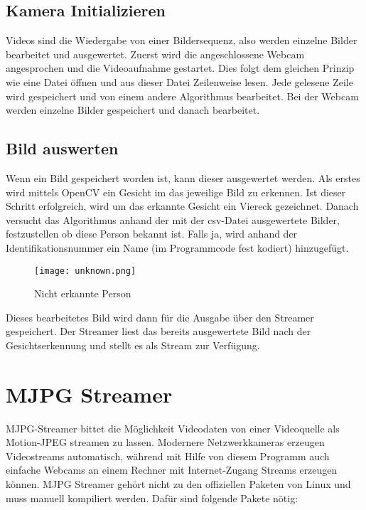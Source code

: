 \subsection{Kamera Initializieren}
 Videos sind die Wiedergabe von einer Bildersequenz, also werden einzelne Bilder bearbeitet und ausgewertet.  Zuerst wird die angeschlossene Webcam angesprochen und die Videoaufnahme gestartet. Dies folgt dem gleichen Prinzip wie eine Datei öffnen und aus dieser Datei Zeilenweise lesen. Jede gelesene Zeile wird gespeichert und von einem andere Algorithmus bearbeitet. Bei der Webcam werden einzelne Bilder gespeichert und danach bearbeitet.\\
 
\subsection{Bild auswerten}
 Wenn ein Bild gespeichert worden ist, kann dieser ausgewertet werden. Als erstes wird mittels OpenCV ein Gesicht im das jeweilige Bild zu erkennen. Ist dieser Schritt erfolgreich, wird um das erkannte Gesicht ein Viereck gezeichnet. Danach versucht das Algorithmus anhand der mit der csv-Datei ausgewertete Bilder, festzustellen ob diese Person bekannt ist. Falls ja, wird anhand der Identifikationsnummer ein Name (im Programmcode fest kodiert) hinzugefügt. \\


\begin{figure}[h]
  \begin{center}		%
    \texttt{[image: unknown.png]}
  		  \caption{Nicht erkannte Person}
     \label{unknown}
  \end{center}
\end{figure}

Dieses bearbeitetes Bild wird dann für die Ausgabe über den Streamer gespeichert. Der Streamer liest das bereits ausgewertete Bild nach der Gesichtserkennung und stellt es als Stream zur Verfügung.
 
 
\section{MJPG Streamer}
MJPG-Streamer bittet die Möglichkeit Videodaten von einer Videoquelle als Motion-JPEG streamen zu lassen. Modernere Netzwerkkameras erzeugen Videostreams automatisch, während mit Hilfe von diesem Programm auch einfache Webcams an einem Rechner mit Internet-Zugang Streams erzeugen können. MJPG Streamer gehört nicht zu den offiziellen Paketen von Linux und muss manuell kompiliert werden. Dafür sind folgende Pakete nötig:

